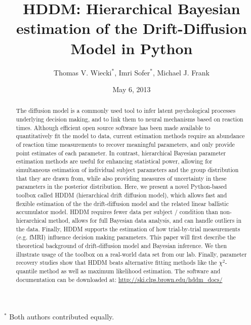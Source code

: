 \documentclass[letterpaper,10pt,english]{article}
\title{HDDM: Hierarchical Bayesian estimation of the Drift-Diffusion Model in Python}
\date{May 6, 2013}
\author{Thomas V. Wiecki$^\ast$, Imri Sofer$^\ast$, Michael J. Frank}
\begin{document}
\maketitle

$^\ast$ Both authors contributed equally.
\begin{abstract}
\label{abstract:abstract}
The diffusion model is a commonly used tool to infer latent psychological processes underlying decision making, and to link them to neural mechanisms based on reaction times. Although efficient open source software has been made available to quantitatively fit the model to data, current estimation methods require an abundance of reaction time measurements to recover meaningful parameters, and only provide point estimates of each parameter.  In contrast, hierarchical Bayesian parameter estimation methods are useful for enhancing statistical power, allowing for simultaneous estimation of individual subject parameters and the group distribution that they are drawn from, while also providing measures of uncertainty in these parameters in the posterior distribution. Here, we present a novel Python-based toolbox called HDDM (hierarchical drift diffusion model), which allows fast and flexible estimation of the the drift-diffusion model and the related linear ballistic accumulator model. HDDM requires fewer data per subject / condition than non-hierarchical method, allows for full Bayesian data analysis, and can handle outliers in the data.  Finally, HDDM supports the estimation of how trial-by-trial measurements (e.g. fMRI) influence decision making parameters. This paper will first describe the theoretical background of drift-diffusion model and Bayesian inference. We then illustrate usage of the toolbox on a real-world data set from our lab. Finally, parameter recovery studies show that HDDM beats alternative fitting methods like the $\chi^2$-quantile method as well as maximum likelihood estimation. The software and documentation can be downloaded at: \href{http://ski.clps.brown.edu/hddm\_docs/}{http://ski.clps.brown.edu/hddm\_docs/}
\end{abstract}

\end{document}
